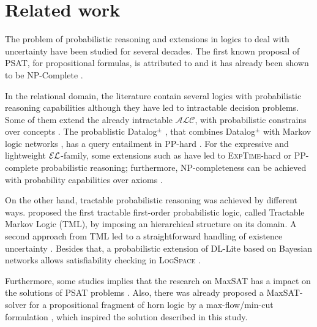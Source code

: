 
\chapter{Related work}
\label{cap:relatedwork}

The problem of probabilistic reasoning and extensions in logics to deal with uncertainty have been studied for several decades. The first known proposal of PSAT, for propositional formulas, is attributed to \citet{boole1854investigation} and it has already been shown to be NP-Complete \citep{georgakopoulos1988probabilistic}.

In the relational domain, the literature contain several logics with probabilistic reasoning capabilities although they have led to intractable decision problems.  Some of them extend the already intractable $\mathcal{ALC}$, with probabilistic constrains over concepts \citep{heinsohn1994probabilistic, lukasiewicz2008expressive, GutierrezBasultoEA11}. The probablistic Datalog$^\pm$ \citep{gottlob2013query}, that combines Datalog$^\pm$ with Markov logic networks \citep{richardson2006markov}, has a query entailment in PP-hard \citep{ceylan_datalog_compl_2016}. For the expressive and lightweight $\mathcal{EL}$-family, some extensions such as \citet{gutierrez2017probabilistic,ceylan2017bayesian} have led to \textsc{ExpTime}-hard or PP-complete probabilistic reasoning; furthermore, NP-completeness can be achieved with probability capabilities over axioms \citep{Fin2019b}.

On the other hand, tractable probabilistic reasoning was achieved by different ways. \citet{Domingos_Webb_2012} proposed the first tractable first-order probabilistic logic, called Tractable Markov Logic (TML), by imposing an hierarchical structure on its domain. A second approach from TML led to a straightforward handling of existence uncertainty \citep{webb2013tractable}. Besides that, a probabilistic extension of DL-Lite based on Bayesian networks allows satisfiability checking in \textsc{LogSpace} \citep{damato_prob_dl_lite_2008}. 

Furthermore, some studies implies that the research on MaxSAT has a impact on the solutions of PSAT problems \citep{andersen2001easy}. Also, there was already proposed a MaxSAT-solver for a propositional fragment of horn logic by a max-flow/min-cut formulation \citep{jaumard1987complexity}, which inspired the solution described in this study.